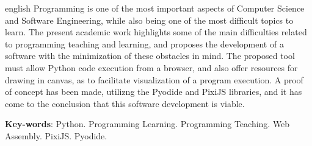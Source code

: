 \begin{resumo}[Abstract]
 \begin{otherlanguage*}{english}
  Programming is one of the most important aspects of Computer Science and Software
  Engineering, while also being one of the most difficult topics to learn. The present academic work highlights some of the main difficulties related to programming teaching and
  learning, and proposes the development of a software with the minimization of these obstacles in mind. The proposed tool must allow Python code execution from a browser,
  and also offer resources for drawing in canvas, as to facilitate visualization of a program
  execution. A proof of concept has been made, utilizng the Pyodide and PixiJS libraries,
  and it has come to the conclusion that this software development is viable.

   \vspace{\onelineskip}
 
   \noindent 
   \textbf{Key-words}: Python. Programming Learning. Programming Teaching. Web Assembly. PixiJS. Pyodide.
 \end{otherlanguage*}
\end{resumo}
